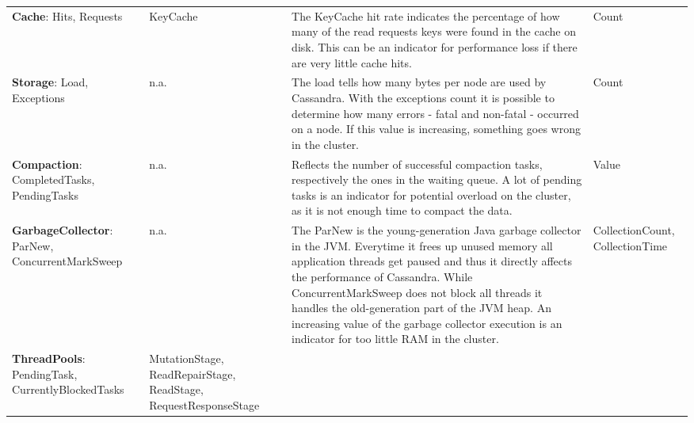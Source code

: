 \begin{table}[]
\begin{tabular}{@{}p{3.2cm}p{2.7cm}p{6.7cm}p{2.2cm}@{}}
\textbf{Cache}: Hits, Requests                               & KeyCache          &
                                                             The KeyCache hit rate indicates the percentage of how many of the read requests keys were found in the cache on disk.
                                                             This can be an indicator for performance loss if there are very little cache hits.
                                                             & Count \\
\textbf{Storage}: Load, Exceptions                           & n.a.              &
                                                             The load tells how many bytes per node are used by Cassandra.
                                                             With the exceptions count it is possible to determine how many errors - fatal and non-fatal - occurred on a node.
                                                             If this value is increasing, something goes wrong in the cluster.
                                                             & Count \\
\textbf{Compaction}: CompletedTasks, PendingTasks            & n.a.              &
                                                             Reflects the number of successful compaction tasks, respectively the ones in the waiting queue.
                                                             A lot of pending tasks is an indicator for potential overload on the cluster, as it is not enough time to compact the data.
                                                             & Value \\
\textbf{GarbageCollector}: ParNew, ConcurrentMarkSweep       & n.a.              &
                                                             The ParNew is the young-generation Java garbage collector in the JVM.
                                                             Everytime it frees up unused memory all application threads get paused and thus it directly affects the performance of Cassandra.
                                                             While ConcurrentMarkSweep does not block all threads it handles the old-generation part of the JVM heap.
                                                             An increasing value of the garbage collector execution is an indicator for too little RAM in the cluster.
                                                             & CollectionCount, CollectionTime \\
\textbf{ThreadPools}: PendingTask, CurrentlyBlockedTasks     & MutationStage, ReadRepairStage, ReadStage, RequestResponseStage        &

\end{tabular}
\end{table}
